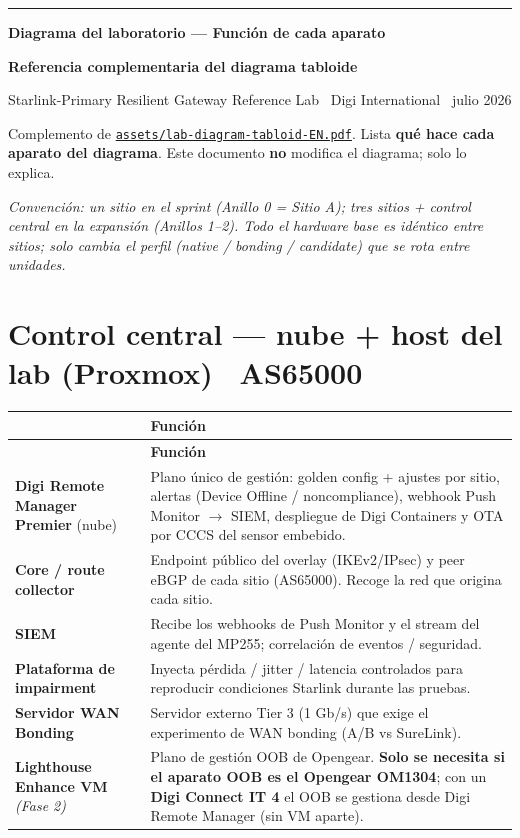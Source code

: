 \documentclass[10pt,letterpaper]{article}
\makeatletter
\newcommand{\kf}[1]{\textbf{\textcolor{PrimaryBlue}{#1}}}
\newcommand{\dtophead}{%
  \rowcolor{PrimaryBlue}{\color{white}\bfseries Aparato} & {\color{white}\bfseries Funci\'on}\\}
\newenvironment{devtable}{%
  \setlength{\arrayrulewidth}{0.4pt}\arrayrulecolor{black!15}%
  \renewcommand{\arraystretch}{1.28}%
  \begin{longtable}{@{}>{\raggedright\arraybackslash}p{4.4cm}@{\hspace{9pt}}>{\raggedright\arraybackslash}p{11.9cm}@{}}
  \dtophead \hline \endfirsthead \dtophead \hline \endhead}
  {\end{longtable}}
\makeatother
\begin{document}
{\color{AccentBlue}\rule{\linewidth}{4pt}}
\vspace{7pt}
{\LARGE\bfseries\color{Slate} Diagrama del laboratorio --- Funci\'on de cada aparato\par}
\vspace{3pt}
{\large\bfseries\color{PrimaryBlue} Referencia complementaria del diagrama tabloide\par}
\vspace{3pt}
{\small\color{Muted} Starlink-Primary Resilient Gateway Reference Lab \textbullet\ Digi International \textbullet\ julio 2026\par}

\vspace{6pt}
Complemento de \href{run:assets/lab-diagram-tabloid-EN.pdf}{\texttt{assets/lab-diagram-tabloid-EN.pdf}}. Lista \kf{qu\'e hace cada aparato del diagrama}. Este documento \textbf{no} modifica el diagrama; solo lo explica.

\vspace{2pt}
{\small\color{Muted}\textit{Convenci\'on: un sitio en el sprint (Anillo 0 = Sitio A); tres sitios + control central en la expansi\'on (Anillos 1--2). Todo el hardware base es id\'entico entre sitios; solo cambia el perfil (native / bonding / candidate) que se rota entre unidades.}}

\section{Control central --- nube + host del lab (Proxmox) \textbullet\ AS65000}
\begin{devtable}
\textbf{Digi Remote Manager Premier} (nube) & Plano \'unico de gesti\'on: golden config + ajustes por sitio, alertas (Device Offline / noncompliance), webhook Push Monitor $\rightarrow$ SIEM, despliegue de Digi Containers y OTA por CCCS del sensor embebido. \\ \hline
\textbf{Core / route collector} & Endpoint p\'ublico del overlay (IKEv2/IPsec) y peer eBGP de cada sitio (AS65000). Recoge la red que origina cada sitio. \\ \hline
\textbf{SIEM} & Recibe los webhooks de Push Monitor y el stream del agente del MP255; correlaci\'on de eventos / seguridad. \\ \hline
\textbf{Plataforma de impairment} & Inyecta p\'erdida / jitter / latencia controlados para reproducir condiciones Starlink durante las pruebas. \\ \hline
\textbf{Servidor WAN Bonding} & Servidor externo Tier 3 (1 Gb/s) que exige el experimento de WAN bonding (A/B vs SureLink). \\ \hline
\textbf{Lighthouse Enhance VM} \textit{(Fase 2)} & Plano de gesti\'on OOB de Opengear. \kf{Solo se necesita si el aparato OOB es el Opengear OM1304}; con un \kf{Digi Connect IT 4} el OOB se gestiona desde Digi Remote Manager (sin VM aparte). \\
\end{devtable}
\end{document}

